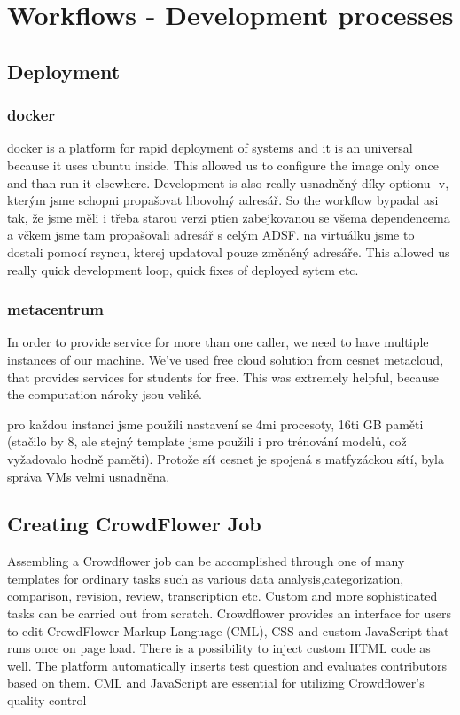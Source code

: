 \chapter{Workflows - Development processes} \label{ch:workflow}

\section{Deployment}

\subsection{docker}

docker is a platform for rapid deployment of systems and it is an universal because it uses ubuntu inside. This allowed us to configure the image only once and than run it elsewhere. Development is also really usnadněný díky optionu -v, kterým jsme schopni propašovat libovolný adresář. So the workflow bypadal asi tak, že jsme měli i třeba starou verzi ptien zabejkovanou se všema dependencema a včkem jsme tam propašovali adresář s celým ADSF. na virtuálku jsme to dostali pomocí rsyncu, kterej updatoval pouze změněný adresáře. This allowed us really quick development loop, quick fixes of deployed sytem etc.

\subsection{metacentrum}

In order to provide service for more than one caller, we need to have multiple instances of our machine. We've used free cloud solution from cesnet metacloud, that provides services for students for free. This was extremely helpful, because the computation nároky jsou veliké.

pro každou instanci jsme použili nastavení se 4mi procesoty, 16ti GB paměti (stačilo by 8, ale stejný template jsme použili i pro trénování modelů, což vyžadovalo hodně paměti). Protože síť cesnet je spojená s matfyzáckou sítí, byla správa VMs velmi usnadněna.


\section{Creating CrowdFlower Job}

Assembling a Crowdflower job can be accomplished through one of many templates for ordinary tasks such as various data analysis,categorization, comparison, revision, review, transcription etc. %
Custom and more sophisticated tasks can be carried out from scratch.
Crowdflower provides an interface for users to edit CrowdFlower Markup Language (CML), CSS and custom JavaScript that runs once on page load.
There is a possibility to inject custom HTML code as well.
The platform automatically inserts test question and evaluates contributors based on them.
CML and JavaScript are essential for utilizing Crowdflower's quality control

